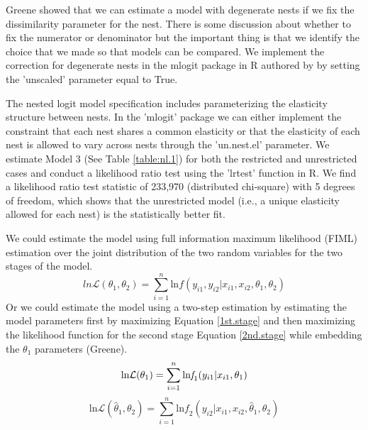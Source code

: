 \documentclass[10pt]{amsart}
\begin{document}
Greene showed that we can estimate a model with degenerate nests if we fix the dissimilarity parameter for the nest.
There is some discussion about whether to fix the numerator or denominator \parencite{} but the important thing is that we identify the choice that we made so that models can be compared. 
We implement the correction for degenerate nests in the mlogit package in R authored by \cite{mlogit2013} by setting the 'unscaled' parameter equal to True. 

The nested logit model specification includes parameterizing the elasticity structure between nests.
In the 'mlogit' package we can either implement the constraint that each nest shares a common elasticity or that the elasticity of each nest is allowed to vary across nests through the 'un.nest.el' parameter.
We estimate Model 3 (See Table \ref{table:nl.1}) for both the restricted and unrestricted cases and conduct a likelihood ratio test using the 'lrtest' function in R. 
We find a likelihood ratio test statistic of 233,970 (distributed chi-square) with 5 degrees of freedom, which shows that the unrestricted model (i.e., a unique elasticity allowed for each nest) is the statistically better fit.   

We could estimate the model using full information maximum likelihood (FIML) estimation over the joint distribution of the two random variables for the two stages of the model.
\begin{equation}
ln \mathcal{L}(\theta_1, \theta_2) = \sum_{i=1}^n \text{ln} \textit{f}(y_{i1}, y_{i2} \vert x_{i1}, x_{i2}, \theta_1, \theta_2)
\end{equation} 
Or we could estimate the model using a two-step estimation by estimating the model parameters first by maximizing Equation \ref{1st.stage} and then maximizing the likelihood function for the second stage Equation \ref{2nd.stage} while embedding the $\theta_1$ parameters \parencite{}(Greene). 
\begin{equation}\label{1st.stage}
\text{ln} \mathcal{L}(\theta_1) = \sum_{i=1}^n \text{ln}\textit{f}_1(y_{i1}\vert x_{i1}, \theta_1) \\
\end{equation}
\begin{equation}\label{2nd.stage}
\text{ln} \mathcal{L}(\hat{\theta}_1, \theta_2) = \sum_{i=1}^n \text{ln}\textit{f}_2(y_{i2}\vert x_{i1},x_{i2}, \hat{\theta}_1, \theta_2) 
\end{equation}
\end{document}

